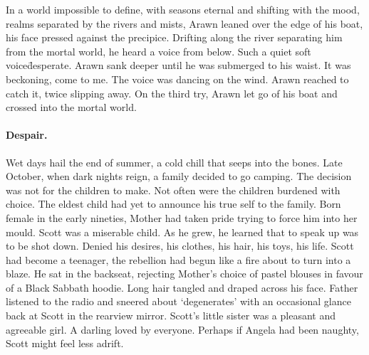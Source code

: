 
\prelude

In a world impossible to define, with seasons eternal and shifting with
the mood, realms separated by the rivers and mists, Arawn leaned over
the edge of his boat, his face pressed against the precipice. Drifting
along the river separating him from the mortal world, he heard a voice
from below. Such a quiet soft voice\=desperate. Arawn sank deeper
until he was submerged to his waist. It was beckoning, come to me. The voice
was dancing on the wind. Arawn reached to catch it, twice slipping
away. On the third try, Arawn let go of his boat and crossed into the
mortal world.


\fugue

\paragraph{Despair.}

Wet days hail the end of summer, a cold chill that seeps into the
bones. Late October, when dark nights reign, a family decided to go
camping. The decision was not for the children to make. Not often were
the children burdened with choice. The eldest child had yet to
announce his true self to the family. Born female in the early
nineties, Mother had taken pride trying to force him into her
mould. Scott was a miserable child. As he grew, he learned that to speak up
was to be shot down. Denied his desires, his clothes, his hair, his
toys, his life. Scott had become a teenager, the rebellion had begun
like a fire about to turn into a blaze. He sat in the backseat,
rejecting Mother’s choice of pastel blouses in favour of a Black Sabbath
hoodie. Long hair tangled and draped across his face. Father listened
to the radio and sneered about `degenerates' with an occasional glance
back at Scott in the rearview mirror. Scott's little sister was a
pleasant and agreeable girl. A darling loved by everyone. Perhaps if
Angela had been naughty, Scott might feel less adrift.


